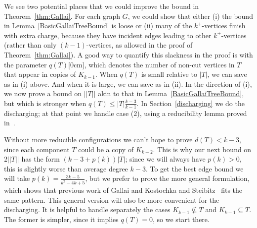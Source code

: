 \documentclass[12pt]{article}
\theoremstyle{plain}
\theoremstyle{definition}
\theoremstyle{remark}
\newcommand{\aside}[1]{\marginnote{\scriptsize{#1}}[0cm]}
\begin{document}
We see two potential places that we could improve the bound in
Theorem~\ref{thm:Gallai}. For each graph $G$, we could show that either (i) the
bound in Lemma~\ref{BasicGallaiTreeBound} is loose or (ii) many of the
$k^+$-vertices finish with extra charge, because they have incident edges
leading to other $k^+$-vertices (rather than only $(k-1)$-vertices, as allowed
in the proof of Theorem~\ref{thm:Gallai}).  A good way to quantify this
slackness in the proof is with the parameter $q(T)$\aside{$q(T)$}, which
denotes the number of non-cut vertices in $T$ that appear in copies of
$K_{k-1}$.  When $q(T)$ is small relative to $|T|$, we can save as in (i)
above.  And when it is large, we can save as in (ii).  In the direction of (i),
we now prove a bound on $||T||$ akin to that in
Lemma~\ref{BasicGallaiTreeBound}, but which is stronger when
$q(T)\le|T|\frac{k-3}{k-1}$.  In Section~\ref{discharging} 
we do the discharging; at that point we handle case (2),
using a reducibility lemma proved in~\cite{OreVizing}. 

Without more reducible configurations we can't hope to prove $d(T) < k-3$, since
each component $T$ could be a copy of $K_{k-2}$.  This is why our next bound on
$2||T||$ has the form $(k-3 + p(k))|T|$; since we will always have $p(k)>0$,
this is slightly worse than average degree $k-3$.  To get the best edge bound
we will take $p(k)=\frac{3k-5}{k^2 - 4k + 5}$, but we prefer to prove the more general
formulation, which shows that previous work of Gallai \cite{gallai1963kritische}
and Kostochka and Steibitz~\cite{kostochkastiebitzedgesincriticalgraph} fits
the same pattern.  This general version will also be more
convenient for the discharging.  %
It is helpful to handle separately the cases $K_{k-1}\not\subseteq T$ and
$K_{k-1}\subseteq T$.  The former is simpler, since it implies $q(T)=0$, so we
start there.
\end{document}
